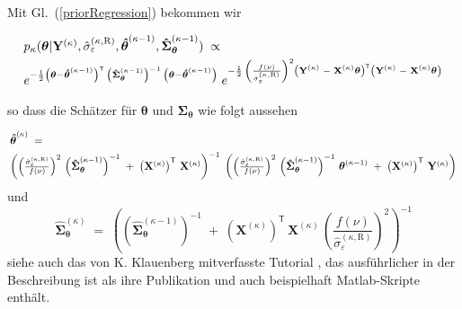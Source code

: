 Mit Gl.~(\ref{priorRegression}) bekommen wir
\begin{equation}
\arraycolsep=2.0pt\def\arraystretch{2.0}
\begin{array}{l}
p_{\kappa}(\boldsymbol{\theta}| \mathbf{Y}^{(\kappa)}, \hat \sigma_{\varepsilon}^{(\kappa,\mathrm{R})},  \boldsymbol{\hat \theta}^{(\kappa-1)},  \boldsymbol{\hat \Sigma}^{(\kappa-1)}_{\boldsymbol{\theta}}) \; \propto \\
e^{-\frac{1}{2} 
	\left(\boldsymbol{\theta} - \boldsymbol{\hat \theta}^{(\kappa-1)} \right)^\mathsf{T} \,
	\left(\boldsymbol{\hat \Sigma}_{\boldsymbol{\theta}}^{(\kappa-1)}\right)^{-1} \, \left(\boldsymbol{\theta} - \boldsymbol{\hat \theta}^{(\kappa-1)} \right)} \;
e^{- \frac{1}{2} \, \left(\frac{f(\nu)}{\hat \sigma_{\varepsilon}^{(\kappa,\mathrm{R})}}\right)^2
	\left(\mathbf{Y}^{(\kappa)} \; - \;  \mathbf{X}^{(\kappa)} \boldsymbol{\theta} \right)^\mathsf{T}
	\left(\mathbf{Y}^{(\kappa)} \; - \;  \mathbf{X}^{(\kappa)} \boldsymbol{\theta} \right)}
\end{array}
\end{equation}
so dass die Schätzer für $\boldsymbol{\theta}$ und $\boldsymbol{\Sigma}_{\boldsymbol{\theta}}$
wie folgt aussehen
\begin{equation}
\arraycolsep=2.0pt\def\arraystretch{2.0}
\begin{array}{l}
\boldsymbol{\hat \theta}^{(\kappa)} \; = \; \\
\left(
\left(\frac{\hat \sigma_{\varepsilon}^{(\kappa,\mathrm{R})}}{f(\nu)}\right)^2 \,
\left(\boldsymbol{\hat \Sigma}_{\boldsymbol{\theta}}^{(\kappa-1)}\right)^{-1}
\; + \;
\left(\mathbf{X}^{(\kappa)}\right)^\mathsf{T} \, \mathbf{X}^{(\kappa)} 
\right)^{-1} \;
\left(
\left( \frac{\hat \sigma_{\varepsilon}^{(\kappa,\mathrm{R})}}{f(\nu)}\right)^2 \,
\left(\boldsymbol{\hat \Sigma}_{\boldsymbol{\theta}}^{(\kappa-1)}\right)^{-1} \,
\boldsymbol{\theta}^{(\kappa-1)} \; + \;
\left(\mathbf{X}^{(\kappa)}\right)^\mathsf{T} \, \mathbf{Y}^{(\kappa)} \right)
\end{array}
\end{equation}
und
\begin{equation}
\boldsymbol{\hat \Sigma}_{\boldsymbol{\theta}}^{(\kappa)} \; = \;
\left(
\left(\boldsymbol{\hat \Sigma}_{\boldsymbol{\theta}}^{(\kappa-1)}\right)^{-1}
\; + \;
\left(\mathbf{X}^{(\kappa)}\right)^\mathsf{T} \, \mathbf{X}^{(\kappa)}  \,
\left(\frac{f(\nu)}{\hat \sigma_{\varepsilon}^{(\kappa,\mathrm{R})}}\right)^2
\right)^{-1} 
\end{equation}
siehe auch das von K. Klauenberg mitverfasste Tutorial \cite{Els15}, das ausführlicher
in der Beschreibung ist als ihre Publikation \cite{Kla15} und auch 
beispielhaft Matlab-Skripte enthält.

